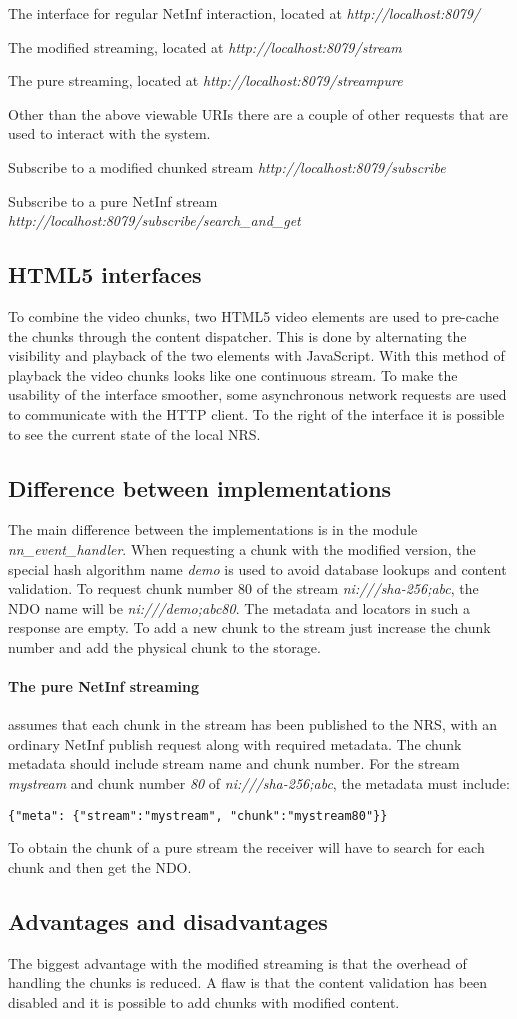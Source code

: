 The interface for regular NetInf interaction, located at 
\textit{http://localhost:8079/}

The modified streaming, located at
\textit{http://localhost:8079/stream}

The pure streaming, located at
\textit{http://localhost:8079/streampure}

Other than the above viewable URIs there are a couple of other requests that are used to interact with the system. 

Subscribe to a modified chunked stream
\textit{http://localhost:8079/subscribe}

Subscribe to a pure NetInf stream
\textit{http://localhost:8079/subscribe/search\_and\_get}


\subsection{HTML5 interfaces}
To combine the video chunks, two HTML5 video elements are used to pre-cache the chunks through the content dispatcher. This is done by alternating the visibility and playback of the two elements with JavaScript. With this method of playback the video chunks looks like one continuous stream. 
To make the usability of the interface smoother, some asynchronous network requests are used to communicate with the HTTP client.
To the right of the interface it is possible to see the current state of the local NRS. 

\subsection{Difference between implementations}
The main difference between the implementations is in the module \textit{nn\_event\_handler}. When requesting a chunk with the modified version, the special hash algorithm name \textit{demo} is used to avoid database lookups and content validation. To request chunk number 80 of the stream \textit{ni:///sha-256;abc}, the NDO name will be \textit{ni:///demo;abc80}. The metadata and locators in such a response are empty. To add a new chunk to the stream just increase the chunk number and add the physical chunk to the storage. 
\paragraph{The pure NetInf streaming} assumes that each chunk in the stream has been published to the NRS, with an ordinary NetInf publish request along with required metadata. The chunk metadata should include stream name and chunk number. For the stream \textit{mystream} and chunk number \textit{80} of \textit{ni:///sha-256;abc}, the metadata must include:
\begin{verbatim}
{"meta": {"stream":"mystream", "chunk":"mystream80"}}
\end{verbatim}
To obtain the chunk of a pure stream the receiver will have to search for each chunk and then get the NDO.

\subsection{Advantages and disadvantages}
The biggest advantage with the modified streaming is that the overhead of handling the chunks is reduced. A flaw is that the content validation has been disabled and it is possible to add chunks with modified content. 